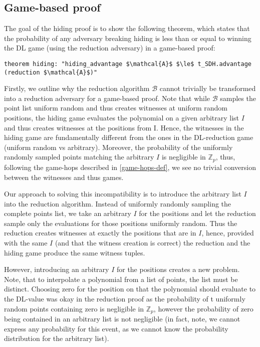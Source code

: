 \subsection*{Game-based proof}
\label{security:hiding:game_based_transf}
The goal of the hiding proof is to show the following theorem, which states that the probability of any adversary breaking hiding is less than or equal to winning the DL game (using the reduction adversary) in a game-based proof:
\begin{lstlisting}[language=isabelle]
    theorem hiding: "hiding_advantage $\mathcal{A}$ $\le$ t_SDH.advantage (reduction $\mathcal{A}$)"
\end{lstlisting}

Firstly, we outline why the reduction algorithm $\mathcal{B}$ cannot trivially be transformed into a reduction adversary for a game-based proof. Note that while $\mathcal{B}$ samples the point list uniform random and thus creates witnesses at uniform random positions, the hiding game evaluates the polynomial on a given arbitrary list $I$ and thus creates witnesses at the positions from I. Hence, the witnesses in the hiding game are fundamentally different from the ones in the DL-reduction game (uniform random vs arbitrary). Moreover, the probability of the uniformly randomly sampled points matching the arbitrary $I$ is negligible in $\mathbb{Z}_p$, thus, following the game-hops described in \ref{game-hops-def}, we see no trivial conversion between the witnesses and thus games.

Our approach to solving this incompatibility is to introduce the arbitrary list $I$ into the reduction algorithm. Instead of uniformly randomly sampling the complete points list, we take an arbitrary $I$ for the positions and let the reduction sample only the evaluations for those positions uniformly random. Thus the reduction creates witnesses at exactly the positions that are in $I$, hence, provided with the same $I$  (and that the witness creation is correct) the reduction and the hiding game produce the same witness tuples.

However, introducing an arbitrary $I$ for the positions creates a new problem. Note, that to interpolate a polynomial from a list of points, the list must be distinct. Choosing zero for the position on that the polynomial should evaluate to the DL-value was okay in the reduction proof as the probability of t uniformly random points containing zero is negligible in $\mathbb{Z}_p$, however the probability of zero being contained in an arbitrary list is not negligible (in fact, note, we cannot express any probability for this event, as we cannot know the probability distribution for the arbitrary list).

